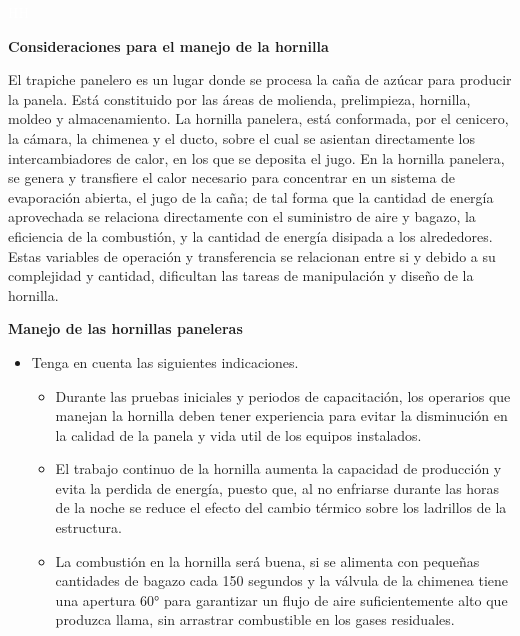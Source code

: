 \documentclass{article}%
\begin{document}
%
\newpage%
\textcolor{white}{%
HH%
}%
\newpage%
\begin{large}%
\begin{Large}%
\textbf{Consideraciones para el manejo de la hornilla}%
\end{Large}%
\newline%
 \newline%
El trapiche panelero es un lugar donde se procesa la caña de azúcar para producir la panela. Está constituido por las áreas de molienda, prelimpieza, hornilla, moldeo y almacenamiento.%
\newline%
 La hornilla panelera, está conformada, por el cenicero, la cámara, la chimenea y el ducto, sobre el cual se asientan directamente los intercambiadores de calor, en los que se deposita el jugo. En la hornilla panelera, se genera y transfiere el calor necesario para concentrar en un sistema de evaporación abierta, el jugo de la caña; de tal forma que la cantidad de energía aprovechada se relaciona directamente con el suministro de aire y bagazo, la eficiencia de la combustión, y la cantidad de energía disipada a los alrededores. Estas variables de operación y transferencia se relacionan entre si y debido a su complejidad y cantidad, dificultan las tareas de manipulación y diseño de la hornilla.%
\begin{Large}%
\textbf{\newline%
 \newline%
 Manejo de las hornillas paneleras}%
\end{Large}%
\begin{itemize}%
\item%
Tenga en cuenta las siguientes indicaciones.%
\begin{itemize}%
\item%
Durante las pruebas iniciales y periodos de capacitación, los operarios que manejan la hornilla deben tener experiencia para evitar la disminución en la calidad de la panela y vida util de los equipos instalados.%
\item%
El trabajo continuo de la hornilla aumenta la capacidad de producción y evita la perdida de energía, puesto que, al no enfriarse durante las horas de la noche se reduce el efecto del cambio térmico sobre los ladrillos de la estructura.%
\item%
La combustión en la hornilla será buena, si se alimenta con pequeñas cantidades de bagazo cada 150 segundos y la válvula de la chimenea tiene una apertura 60° para garantizar un flujo de aire suficientemente alto que produzca llama, sin arrastrar combustible en los gases residuales.%

\end{itemize}
\end{itemize}
\end{large}
\end{document}
